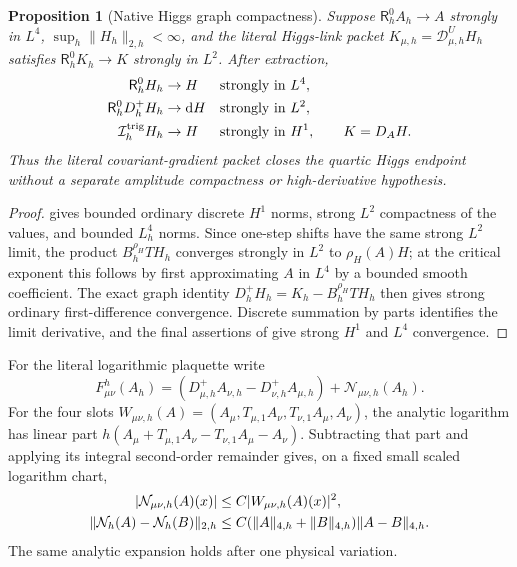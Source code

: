 \documentclass[11pt]{article}
\numberwithin{equation}{section}
\newtheorem{proposition}[proposition]{Proposition}
\theoremstyle{definition}
\theoremstyle{remark}
\newcommand{\dd}{\mathrm d}
\newcommand{\norm}[1]{\lVert#1\rVert}
\begin{document}
\begin{proposition}[Native Higgs graph compactness]
\label{prop:native-Higgs-compactness}
Suppose
$\mathsf R_h^0A_h\to A$ strongly in $L^4$,
$\sup_h\norm{H_h}_{2,h}<\infty$, and the literal Higgs-link packet
$K_{\mu,h}=\mathcal D^U_{\mu,h}H_h$ satisfies
$\mathsf R_h^0K_h\to K$ strongly in $L^2$.  After extraction,
\begin{align}
 \mathsf R_h^0H_h&\to H &&\text{strongly in }L^4,\notag\\
 \mathsf R_h^0D_h^+H_h&\to\dd H &&\text{strongly in }L^2,\notag\\
 \mathcal I_h^{\rm trig}H_h&\to H &&\text{strongly in }H^1,
 \qquad K=D_AH.
 \label{eq:native-Higgs-compactness}
\end{align}
Thus the literal covariant-gradient packet closes the quartic Higgs endpoint
without a separate amplitude compactness or high-derivative hypothesis.
\end{proposition}
\begin{proof}
 gives bounded ordinary discrete $H^1$ norms,
strong $L^2$ compactness of the values, and bounded $L_h^4$ norms.  Since
one-step shifts have the same strong $L^2$ limit, the product
$B_h^{\rho_H}T H_h$ converges strongly in $L^2$ to $\rho_H(A)H$; at the
critical exponent this follows by first approximating $A$ in $L^4$ by a
bounded smooth coefficient.  The exact graph identity
$D_h^+H_h=K_h-B_h^{\rho_H}T H_h$ then gives strong ordinary first-difference
convergence.  Discrete summation by parts identifies the limit derivative,
and the final assertions of  give strong
$H^1$ and $L^4$ convergence.
\end{proof}

For the literal logarithmic plaquette write
\begin{equation}
 F^h_{\mu\nu}(A_h)
 =(D^+_{\mu,h}A_{\nu,h}-D^+_{\nu,h}A_{\mu,h})
       +\mathcal N_{\mu\nu,h}(A_h).
 \label{eq:native-YM-split}
\end{equation}
For the four slots
$W_{\mu\nu,h}(A)=(A_\mu,T_{\mu,1}A_\nu,T_{\nu,1}A_\mu,A_\nu)$,
the analytic logarithm has linear part
$h(A_\mu+T_{\mu,1}A_\nu-T_{\nu,1}A_\mu-A_\nu)$.
Subtracting that part and applying its integral second-order remainder
gives, on a fixed small scaled logarithm chart,
\begin{align}
 |\mathcal N_{\mu\nu,h}(A)(x)|&\le C|W_{\mu\nu,h}(A)(x)|^2,\notag\\
 \norm{\mathcal N_h(A)-\mathcal N_h(B)}_{2,h}
 &\le C(\norm A_{4,h}+\norm B_{4,h})\norm{A-B}_{4,h}.
 \label{eq:native-YM-envelope}
\end{align}
The same analytic expansion holds after one physical variation.
\end{document}
